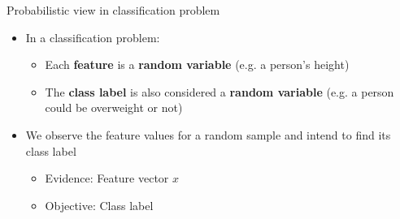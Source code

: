 \documentclass[serif, aspectratio=169]{beamer}
\begin{document}

    \begin{frame}{Probabilistic view in classification problem}
        \begin{itemize}
            \item In a classification problem:
            \begin{itemize}
                \item Each \textbf{feature} is a \textbf{random variable} (e.g. a person's height)
                \item The \textbf{class label} is also considered a \textbf{random variable} (e.g. a person could be overweight or not)
            \end{itemize}
            \item We observe the feature values for a random sample and intend to find its class label
            \begin{itemize}
                \item Evidence: Feature vector $x$
                \item Objective: Class label
            \end{itemize}
        \end{itemize}
    \end{frame}
\end{document}
